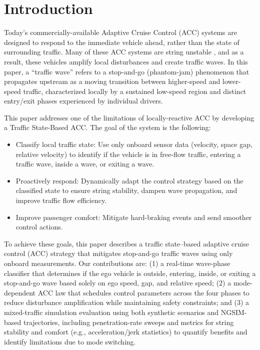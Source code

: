 \documentclass[conference]{IEEEtran}
\newcommand{\kibitz}[2]{\ifnum\Comments=1\textcolor{#1}{#2}\fi}
\newcommand{\jms}[1]{\kibitz{darkgreen}      {[JMS: #1]}}
\begin{document}
\section{Introduction}


Today's commercially-available Adaptive Cruise Control (ACC) systems are designed to respond to the immediate vehicle ahead, rather than the state of surrounding traffic. 
Many of these ACC systems are string unstable \cite{Gunter2021StringStable}, and as a result, these vehicles amplify local disturbances and create traffic waves.
In this paper, a “traffic wave” refers to a stop-and-go (phantom-jam) phenomenon that propagates upstream as a moving transition between higher-speed and lower-speed traffic, characterized locally by a sustained low-speed region and distinct entry/exit phases experienced by individual drivers.

This paper addresses one of the limitations of locally-reactive ACC by developing a Traffic State-Based ACC. The goal of the system is the following:

\begin{itemize}

\item Classify local traffic state: Use only onboard sensor data (velocity, space gap, relative velocity) to identify if the vehicle is in free-flow traffic, entering a traffic wave, inside a wave, or exiting a wave.
\item Proactively respond: Dynamically adapt the control strategy based on the classified state to ensure string stability, dampen wave propagation, and improve traffic flow efficiency.
\item Improve passenger comfort: Mitigate hard-braking events and send smoother control actions.
\end{itemize}

To achieve these goals, this paper describes a traffic state–based adaptive cruise control (ACC) strategy that mitigates stop-and-go traffic waves using only onboard measurements. Our contributions are: (1) a real-time wave-phase classifier that determines if the ego vehicle is outside, entering, inside, or exiting a stop-and-go wave based solely on ego speed, gap, and relative speed; (2) a mode-dependent ACC law that schedules control parameters across the four phases to reduce disturbance amplification while maintaining safety constraints; and (3) a mixed-traffic simulation evaluation using both synthetic scenarios and NGSIM-based trajectories, including penetration-rate sweeps and metrics for string stability and comfort (e.g., acceleration/jerk statistics) to quantify benefits and identify limitations due to mode switching.
\end{document}
